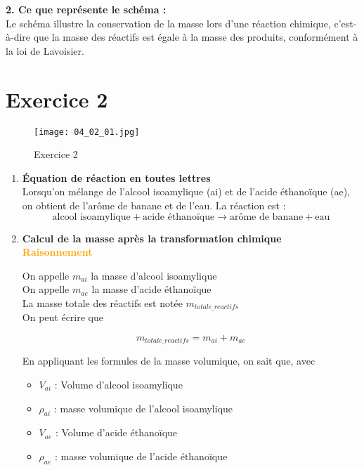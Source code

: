 \documentclass[a4paper,12pt]{article}
\begin{document}
\noindent
\textbf{2. Ce que représente le schéma :} \\
Le schéma illustre la conservation de la masse lors d'une réaction chimique, c'est-à-dire que la masse des réactifs est égale à la masse des produits, conformément à la loi de Lavoisier.

\section{Exercice 2}

\begin{figure}[H]
  \centering
  \texttt{[image: 04\_02\_01.jpg]}
  \caption{Exercice 2}
\end{figure}

\begin{enumerate}[label=\textbf{\arabic*.}]
    \item \textbf{Équation de réaction en toutes lettres}\\
    Lorsqu'on mélange de l'alcool isoamylique (ai) et de l'acide éthanoïque (ae), on obtient de l'arôme de banane et de l'eau. La réaction est :
    \[
    \text{alcool isoamylique} + \text{acide éthanoïque} \rightarrow \text{arôme de banane} + \text{eau}
    \]

    \item \textbf{Calcul de la masse après la transformation chimique}\\
    
    \textcolor{orange}{\textbf{Raisonnement}}

    On appelle $m_{ai}$ la masse d'alcool isoamylique \\
    On appelle $m_{ae}$ la masse d'acide éthanoïque \\
    La masse totale des réactifs est notée $m_{totale\_reactifs}$ \\

    On peut écrire que 
    
    \[
    m_{totale\_reactifs} = m_{ai} + m_{ae}
    \]

    En appliquant les formules de la masse volumique, on sait que, avec
    \begin{itemize}[noitemsep]
      \item $V_{ai}$ : Volume d'alcool isoamylique
      \item $\rho_{ai}$ : masse volumique de l'alcool isoamylique
      \item $V_{ae}$ : Volume d'acide éthanoïque
      \item $\rho_{ae}$ : masse volumique de l'acide éthanoïque
    \end{itemize}
    

\end{enumerate}
\end{document}

